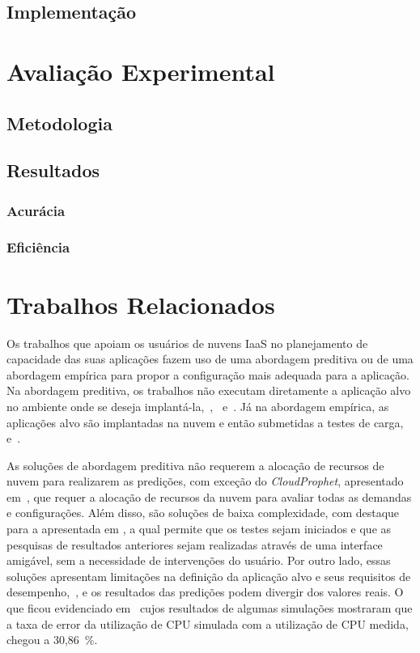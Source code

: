 \documentclass[12pt]{article}
\begin{document}
\subsection{Implementação}

\section{Avaliação Experimental}\label{sec:experiments}

\subsection{Metodologia}

\subsection{Resultados}

\subsubsection{Acurácia}

\subsubsection{Eficiência}

\section{Trabalhos Relacionados}\label{sec:related-work}

Os trabalhos que apoiam os usuários de nuvens IaaS no planejamento de capacidade
das suas aplicações fazem uso de uma abordagem preditiva ou de uma abordagem
empírica para propor a configuração mais adequada para a aplicação. Na abordagem
preditiva, os trabalhos não executam diretamente a aplicação alvo no ambiente
onde se deseja
implantá-la,~\cite{cloudharmony},~\cite{malkowski2010cloudxplor,li2011,jung2013cloudadvisor,fittkau2012cdosim} e~\cite{li2011cloudprophet}.
Já na abordagem empírica, as aplicações alvo são implantadas na
nuvem e então submetidas a testes de
carga,~\cite{jayasinghe2012,silva2013cloudbench,cunhacloud}
e~\cite{scheuner2014cloud}.

As soluções de abordagem preditiva não requerem a alocação de
recursos de nuvem para realizarem as predições, com
exceção do \textit{CloudProphet}, apresentado em~\cite{li2011cloudprophet}, que
requer a alocação de recursos da nuvem para avaliar todas as demandas e configurações.
Além disso, são soluções de baixa complexidade, com destaque para a
apresentada em \cite{cloudharmony}, a qual permite que os testes sejam
iniciados e que as pesquisas de resultados anteriores sejam realizadas através de uma
interface amigável, sem a necessidade de intervenções do usuário. Por outro
lado, essas soluções apresentam limitações na definição da aplicação alvo e
seus requisitos de desempenho,~\cite{malkowski2010cloudxplor,cloudharmony}, e os
resultados das predições podem divergir dos valores reais. O que
ficou evidenciado em~\cite{fittkau2012cdosim} cujos resultados de algumas
simulações mostraram que a taxa de error da utilização de CPU simulada com a
utilização de CPU medida, chegou a 30,86~\%. 
\end{document}
